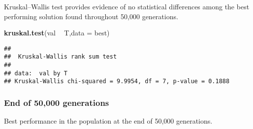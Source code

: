 \documentclass[]{book}
\newenvironment{Shaded}{\begin{snugshade}}{\end{snugshade}}
\newcommand{\DataTypeTok}[1]{\textcolor[rgb]{0.13,0.29,0.53}{#1}}
\newcommand{\KeywordTok}[1]{\textcolor[rgb]{0.13,0.29,0.53}{\textbf{#1}}}
\newcommand{\NormalTok}[1]{#1}
\newcommand{\OperatorTok}[1]{\textcolor[rgb]{0.81,0.36,0.00}{\textbf{#1}}}
\newcommand{\StringTok}[1]{\textcolor[rgb]{0.31,0.60,0.02}{#1}}
\begin{document}
Kruskal--Wallis test provides evidence of no statistical differences among the best performing solution found throughout 50,000 generations.

\begin{Shaded}
\begin{Highlighting}[]
\KeywordTok{kruskal.test}\NormalTok{(val }\OperatorTok{~}\StringTok{ }\NormalTok{T,}\DataTypeTok{data =}\NormalTok{ best)}
\end{Highlighting}
\end{Shaded}

\begin{verbatim}
## 
##  Kruskal-Wallis rank sum test
## 
## data:  val by T
## Kruskal-Wallis chi-squared = 9.9954, df = 7, p-value = 0.1888
\end{verbatim}

\hypertarget{end-of-50000-generations-12}{%
\subsubsection{End of 50,000 generations}\label{end-of-50000-generations-12}}

Best performance in the population at the end of 50,000 generations.
\end{document}

